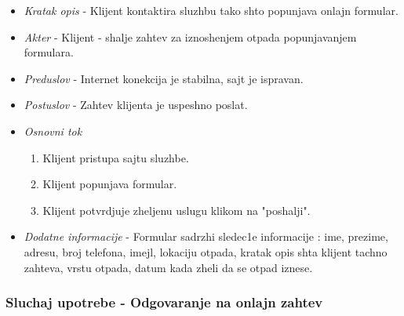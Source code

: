 \documentclass[10 pt]{article}
\begin{document}
		\begin{itemize}
			
			\item\textit{Kratak opis} - Klijent kontaktira sluzhbu tako shto popunjava onlajn formular.
	
			\item\textit{Akter} - Klijent - shalje zahtev za iznoshenjem otpada popunjavanjem formulara.
			
			\item\textit{Preduslov} - Internet konekcija je stabilna, sajt je ispravan.
			
			\item\textit{Postuslov} - Zahtev klijenta je uspeshno poslat.

			
			\item\textit{Osnovni tok} 
				\begin{enumerate}
					\item Klijent pristupa sajtu sluzhbe.

					\item Klijent popunjava formular.

					\item Klijent potvrdjuje zheljenu uslugu klikom na "poshalji".
				\end{enumerate}
			
			\item\textit{Dodatne informacije}
- Formular sadrzhi sledec1e informacije : ime, prezime, adresu, broj telefona, imejl, lokaciju otpada, kratak opis shta klijent tachno zahteva, vrstu otpada, datum kada zheli da se otpad iznese.
			

		\end{itemize}
	
	\subsubsection{Sluchaj upotrebe - Odgovaranje na onlajn zahtev}
	
\end{document}
